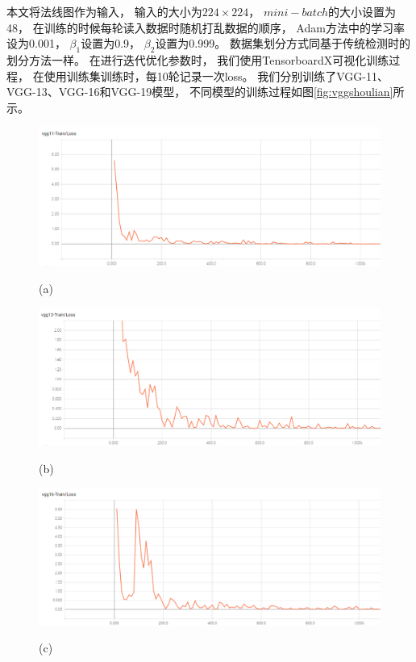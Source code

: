 本文将法线图作为输入，
输入的大小为$224\times224$，
$mini-batch$的大小设置为48，
在训练的时候每轮读入数据时随机打乱数据的顺序，
Adam方法中的学习率设为0.001，
$\beta_1$设置为0.9，
$\beta_2$设置为0.999。
数据集划分方式同基于传统检测时的划分方法一样。
在进行迭代优化参数时，
我们使用TensorboardX可视化训练过程，
在使用训练集训练时，每10轮记录一次loss。
我们分别训练了VGG-11、VGG-13、VGG-16和VGG-19模型，
不同模型的训练过程如图\ref{fig:vggshoulian}所示。
\begin{figure}[htbp]
\begin{minipage}{1.0\linewidth}
\centerline{\includegraphics[width=1.0\linewidth]{figures/vgg11.png}}
\centerline{(a)}
\end{minipage}

\begin{minipage}{1.0\linewidth}
\centerline{\includegraphics[width=1.0\linewidth]{figures/vgg13.png}}
\centerline{(b)}
\end{minipage}

\begin{minipage}{1.0\linewidth}
\centerline{\includegraphics[width=1.0\linewidth]{figures/vgg16.png}}
\centerline{(c)}
\end{minipage}


\end{figure}
